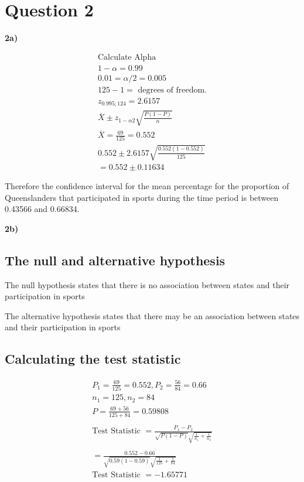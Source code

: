 \documentclass[oneside, a4paper]{article}
\begin{document}
\newpage

\section{Question 2}
\textbf{2a)}

\begin{equation*}
    \begin{split}
        \text{Calculate Alpha} \\
        1 - \alpha = 0.99 \\
        0.01 = \alpha / 2 = 0.005 \\
        125 - 1 = \text{ degrees of freedom.} \\
        z_{0.995;124} =  2.6157 \\
        \overline{X} \pm z_{1-\alpha2}\sqrt{\frac{P(1-P)}{n}}  \\
        \overline{X} = \frac{69}{125} = 0.552 \\
        0.552 \pm 2.6157 \sqrt{\frac{0.552(1-0.552)}{125}} \\
        = 0.552 \pm 0.11634
    \end{split}
\end{equation*}

Therefore the confidence interval for the mean percentage for the proportion of Queenslanders that participated in sports during the time period is between 0.43566 and 0.66834.

\textbf{2b)}

\subsection{The null and alternative hypothesis}

The null hypothesis states that there is no association between states and their participation in sports

The alternative hypothesis states that there may be an association between states and their participation in sports


\subsection{Calculating the test statistic}

\begin{equation*}
    \begin{split}
        P_1 = \frac{69}{125} = 0.552, P_2 = \frac{56}{84} = 0.66 \\
        n_1 = 125, n_2 = 84 \\
        P = \frac{69+56}{125+84} = 0.59808 \\ \\
        \text{Test Statistic } = \frac{P_1 - P_2}{\sqrt{P(1-P)} \sqrt{\frac{1}{n_1}+{\frac{1}{n_2}}}} \\ \\
        = \frac{0.552 - 0.66}{\sqrt{0.59(1-0.59)} \sqrt{\frac{1}{125}+{\frac{1}{84}}}} \\
        \text{Test Statistic } = -1.65771
    \end{split}
\end{equation*}
\end{document}
